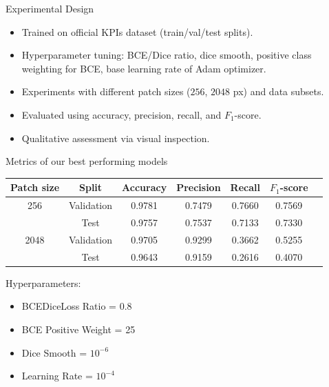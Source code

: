 \documentclass{beamer}
\begin{document}
\begin{frame}{Experimental Design}
    \begin{itemize}
        \item Trained on official KPIs dataset (train/val/test splits).
        \item Hyperparameter tuning: BCE/Dice ratio, dice smooth, positive class weighting for BCE, base learning rate of Adam optimizer.
        \item Experiments with different patch sizes ($256$, $2048$ px) and data subsets.
        \item Evaluated using accuracy, precision, recall, and $F_1$-score.
        \item Qualitative assessment via visual inspection.
    \end{itemize}
\end{frame}

\begin{frame}{Metrics of our best performing models}
    \begin{table}[t]
        \centering
        \begin{tabular}{c|c|ccccc}
            \toprule
            Patch size & Split & Accuracy & Precision & Recall & $F_1$-score \\
            \midrule
            256 & Validation & 0.9781 & 0.7479 & 0.7660 & 0.7569 \\
            & Test       & 0.9757 & 0.7537 & 0.7133 & 0.7330 \\
            \midrule
            2048 & Validation & 0.9705 & 0.9299 & 0.3662 & 0.5255 \\
            & Test       & 0.9643 & 0.9159 & 0.2616 & 0.4070 \\
            \bottomrule
        \end{tabular}
    \end{table}
    \begin{block}{Hyperparameters:}
        \begin{itemize}
            \item BCEDiceLoss Ratio = 0.8
            \item BCE Positive Weight = 25
            \item Dice Smooth = $10^{-6}$
            \item Learning Rate = $10^{-4}$
        \end{itemize}
    \end{block}
\end{frame}
\end{document}
